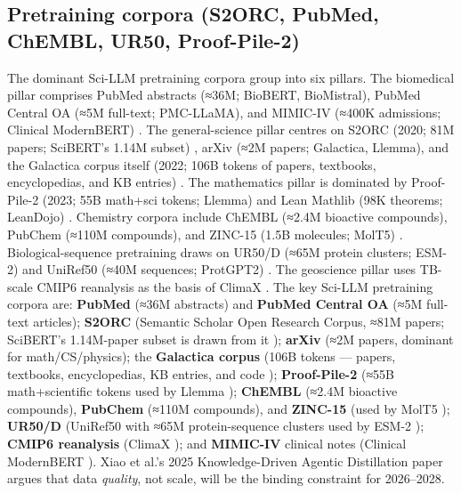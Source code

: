 \documentclass{article}
\begin{document}
\subsection{Pretraining corpora (S2ORC, PubMed, ChEMBL, UR50, Proof-Pile-2)}\label{pretraining-corpora-s2orc-pubmed-chembl-ur50-proof-pile-2}

The dominant Sci-LLM pretraining corpora group into six pillars. The biomedical pillar comprises PubMed abstracts (≈36M; BioBERT, BioMistral), PubMed Central OA (≈5M full-text; PMC-LLaMA), and MIMIC-IV (≈400K admissions; Clinical ModernBERT) \cite{lee2025arxiv2504039642025}. The general-science pillar centres on S2ORC (2020; 81M papers; SciBERT's 1.14M subset) \cite{beltagy2019arxiv1903106762019}, arXiv (≈2M papers; Galactica, Llemma), and the Galactica corpus itself (2022; 106B tokens of papers, textbooks, encyclopedias, and KB entries) \cite{taylor2022arxiv2211090852022}. The mathematics pillar is dominated by Proof-Pile-2 (2023; 55B math+sci tokens; Llemma) \cite{azerbayev2023llemmaanopenlangua} and Lean Mathlib (98K theorems; LeanDojo) \cite{yang2023leandojotheorempro}. Chemistry corpora include ChEMBL (≈2.4M bioactive compounds), PubChem (≈110M compounds), and ZINC-15 (1.5B molecules; MolT5) \cite{edwards2022emnlp2022}. Biological-sequence pretraining draws on UR50/D (≈65M protein clusters; ESM-2) \cite{lin2022evolutionaryscalep} and UniRef50 (≈40M sequences; ProtGPT2) \cite{ferruz2022naturecommunicatio}. The geoscience pillar uses TB-scale CMIP6 reanalysis as the basis of ClimaX \cite{nguyen2023arxiv2301103432023}. The key Sci-LLM pretraining corpora are: \textbf{PubMed} (≈36M abstracts) and \textbf{PubMed Central OA} (≈5M full-text articles); \textbf{S2ORC} (Semantic Scholar Open Research Corpus, ≈81M papers; SciBERT's 1.14M-paper subset is drawn from it \cite{beltagy2019arxiv1903106762019}); \textbf{arXiv} (≈2M papers, dominant for math/CS/physics); the \textbf{Galactica corpus} (106B tokens --- papers, textbooks, encyclopedias, KB entries, and code \cite{taylor2022arxiv2211090852022}); \textbf{Proof-Pile-2} (≈55B math+scientific tokens used by Llemma \cite{azerbayev2023llemmaanopenlangua}); \textbf{ChEMBL} (≈2.4M bioactive compounds), \textbf{PubChem} (≈110M compounds), and \textbf{ZINC-15} (used by MolT5 \cite{edwards2022emnlp2022}); \textbf{UR50/D} (UniRef50 with ≈65M protein-sequence clusters used by ESM-2 \cite{lin2022evolutionaryscalep}); \textbf{CMIP6 reanalysis} (ClimaX \cite{nguyen2023arxiv2301103432023}); and \textbf{MIMIC-IV} clinical notes (Clinical ModernBERT \cite{lee2025arxiv2504039642025}). Xiao et al.'s 2025 Knowledge-Driven Agentic Distillation paper \cite{xiao2025knowledgedrivenage} argues that data \emph{quality}, not scale, will be the binding constraint for 2026--2028.
\end{document}
